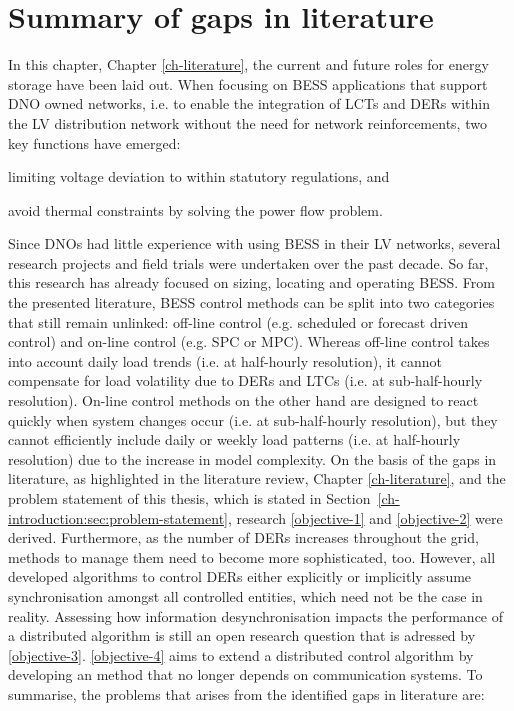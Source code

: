 \section{Summary of gaps in literature}
\label{ch-literature:sec:literature-gaps}

In this chapter, Chapter \ref{ch-literature}, the current and future roles for energy storage have been laid out.
When focusing on BESS applications that support DNO owned networks, i.e. to enable the integration of LCTs and DERs within the LV distribution network without the need for network reinforcements, two key functions have emerged:
\begin{enumerate*}
	\item limiting voltage deviation to within statutory regulations, and
	\item avoid thermal constraints by solving the power flow problem.
\end{enumerate*}
Since DNOs had little experience with using BESS in their LV networks, several research projects and field trials were undertaken over the past decade.
So far, this research has already focused on sizing, locating and operating BESS.
From the presented literature, BESS control methods can be split into two  categories that still remain unlinked: off-line control (e.g. scheduled or forecast driven control) and on-line control (e.g. SPC or MPC).
Whereas off-line control takes into account daily load trends (i.e. at half-hourly resolution), it cannot compensate for load volatility due to DERs and LTCs (i.e. at sub-half-hourly resolution).
On-line control methods on the other hand are designed to react quickly when system changes occur (i.e. at sub-half-hourly resolution), but they cannot efficiently include daily or weekly load patterns (i.e. at half-hourly resolution) due to the increase in model complexity.
On the basis of the gaps in literature, as highlighted in the literature review, Chapter \ref{ch-literature}, and the problem statement of this thesis, which is stated in Section~\ref{ch-introduction:sec:problem-statement}, research \ref{objective-1} and \ref{objective-2} were derived.
Furthermore, as the number of DERs increases throughout the grid, methods to manage them need to become more sophisticated, too.
However, all developed algorithms to control DERs either explicitly or implicitly assume synchronisation amongst all controlled entities, which need not be the case in reality.
Assessing how information desynchronisation impacts the performance of a distributed algorithm is still an open research question that is adressed by \ref{objective-3}.
\ref{objective-4} aims to extend a distributed control algorithm by developing an method that no longer depends on communication systems.
To summarise, the problems that arises from the identified gaps in literature are:

